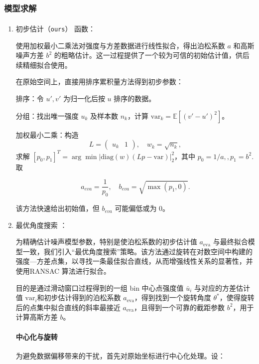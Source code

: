 \documentclass[a4paper]{article}
\newcommand{\supercite}[1]{\textsuperscript{\cite{#1}}}
\begin{document}
	\subsubsection{模型求解}
     
    \begin{enumerate}
    \item 初步估计（\texttt{ours}）\supercite{ref2} 函数：\par
    \hspace{2em}使用加权最小二乘法对强度与方差数据进行线性拟合，得出泊松系数 $a$ 和高斯噪声方差 $b^2$ 的粗略估计。这一过程提供了一个较为可信的初始估计值，供后续精细拟合使用。\par
	
	在原始空间上，直接用排序累积量方法得到初步参数：\par
	
	排序：令 $u',v'$ 为归一化后按 $u$ 排序的数据。\par
	分组：找出唯一强度 $u_k$ 及样本数 $n_k$，计算 $\mathrm{var}_k=\mathbb{E}[(v'-u')^2]$。\par
	加权最小二乘：构造
	$$
		L=\begin{pmatrix}u_k & 1\end{pmatrix},\quad
		w_k = \sqrt{n_k},
	$$
    求解 $[p_0,p_1]^T=\arg\min|\mathrm{diag}(w)(Lp - \mathrm{var})|_2^2$，其中 $p_0=1/a,,p_1=b^2$. 取

    $$
		a_{eva} = \frac{1}{p_0},\quad
		b_{eva} = \sqrt{\max(p_1, 0)}.
	$$

	 

    该方法快速给出初始值，但 $b_{eva}$ 可能偏低或为 0。
		\item 最优角度搜索 ：\par
		\hspace{2em}为精确估计噪声模型参数，特别是使泊松系数的初步估计值 $a_{\text{eva}}$ 与最终拟合模型一致，我们引入“最优角度搜索”策略。该方法通过旋转在对数空间中构建的强度—方差点集，以寻找一条最佳拟合直线，从而增强线性关系的显著性，并使用RANSAC 算法进行拟合。\par
		\hspace{2em}目的是通过滑动窗口过程得到的一组 bin 中心点强度值 $\bar u_i$ 与对应的方差估计值 $\mathrm{var}_i$和初步估计得到的泊松系数 $a_{\text{eva}}$，得到找到一个旋转角度 $\theta^*$，使得旋转后的点集中拟合直线的斜率最接近 $a_{\text{eva}}$，且得到一个可靠的截距参数 $b^2$，用于计算高斯方差 $b$。\par
        \paragraph{中心化与旋转}为避免数据偏移带来的干扰，首先对原始坐标进行中心化处理。设：


\end{enumerate}
\end{document}
